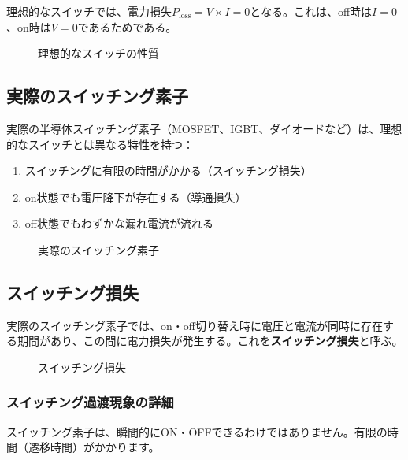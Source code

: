 理想的なスイッチでは、電力損失$P_{\text{loss}} = V \times I = 0$となる。これは、off時は$I = 0$、on時は$V = 0$であるためである。

\begin{figure}[H]
\centering
{}
\caption{理想的なスイッチの性質}
\label{fig:ideal_switch}
\end{figure}

\subsection{実際のスイッチング素子}

実際の半導体スイッチング素子（MOSFET、IGBT、ダイオードなど）は、理想的なスイッチとは異なる特性を持つ：

\begin{enumerate}
\item スイッチングに有限の時間がかかる（スイッチング損失）
\item on状態でも電圧降下が存在する（導通損失）
\item off状態でもわずかな漏れ電流が流れる
\end{enumerate}

\begin{figure}[H]
\centering
{}
\caption{実際のスイッチング素子}
\label{fig:real_switch}
\end{figure}

\subsection{スイッチング損失}

実際のスイッチング素子では、on・off切り替え時に電圧と電流が同時に存在する期間があり、この間に電力損失が発生する。これを\textbf{スイッチング損失}と呼ぶ。

\begin{figure}[H]
\centering
{}
\caption{スイッチング損失}
\label{fig:switching_loss}
\end{figure}

\subsubsection{スイッチング過渡現象の詳細}

スイッチング素子は、瞬間的にON・OFFできるわけではありません。有限の時間（遷移時間）がかかります。

